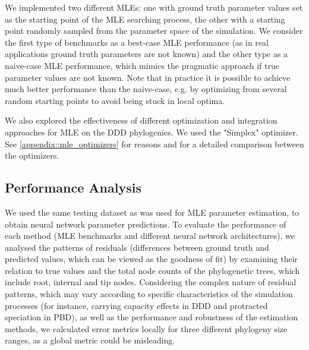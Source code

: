 {We implemented two different MLEs: one with ground truth parameter values set as the starting point of the MLE searching process, the other with a starting point randomly sampled from the parameter space of the simulation. We consider the first type of benchmarks as a best-case MLE performance (as in real applications ground truth parameters are not known) and the other type as a naive-case MLE performance, which mimics the pragmatic approach if true parameter values are not known. Note that in practice it is possible to achieve much better performance than the naive-case, e.g. by optimizing from several random starting points to avoid being stuck in local optima.

We also explored the effectiveness of different optimization and integration approaches for MLE on the DDD phylogenies. We used the "Simplex" \citep{lagarias_convergence_1998} optimizer. See \autoref{appendix::mle_optimizers} for reasons and for a detailed comparison between the optimizers. 

\subsection{Performance Analysis}
\label{ch2::sec::methods::performance}
We used the same testing dataset as was used for MLE parameter estimation, to obtain neural network parameter predictions. To evaluate the performance of each method (MLE benchmarks and different neural network architectures), we analysed the patterns of residuals (differences between ground truth and predicted values, which can be viewed as the goodness of fit) by examining their relation to true values and the total node counts of the phylogenetic trees, which include root, internal and tip nodes. Considering the complex nature of residual patterns, which may vary according to specific characteristics of the simulation processes (for instance, carrying capacity effects in DDD and protracted speciation in PBD), as well as the performance and robustness of the estimation methods, we calculated error metrics locally for three different phylogeny size ranges, as a global metric could be misleading. 

}
